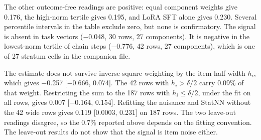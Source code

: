 The other outcome-free readings are positive: equal component weights give 0.176, the high-norm tertile gives 0.195, and LoRA SFT alone gives 0.230. Several percentile intervals in the table exclude zero, but none is confirmatory. The signal is absent in task vectors ($-$0.048, 30 rows, 27 components). It is negative in the lowest-norm tertile of chain steps ($-$0.776, 42 rows, 27 components), which is one of 27 stratum cells in the companion file.

The estimate does not survive inverse-square weighting by the item half-width $h_i$, which gives $-$0.257 [$-$0.666, 0.074]. The 42 rows with $h_i > \delta/2$ carry 0.09\% of that weight. Restricting the sum to the 187 rows with $h_i \le \delta/2$, under the fit on all rows, gives 0.007 [$-$0.164, 0.154]. Refitting the nuisance and StatNN without the 42 wide rows gives 0.119 [0.0003, 0.231] on 187 rows. The two leave-out readings disagree, so the 0.7\% reported above depends on the fitting convention. The leave-out results do not show that the signal is item noise either.

